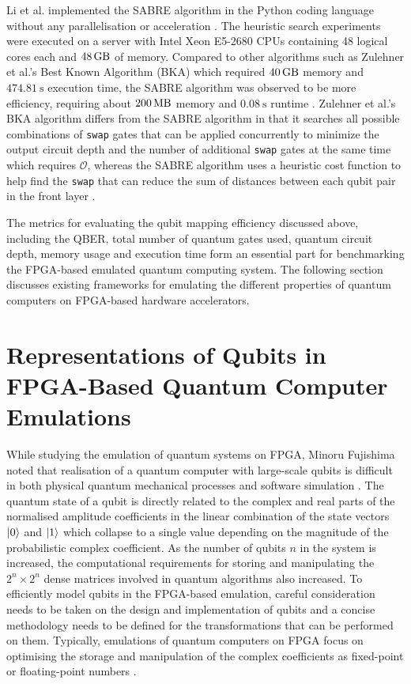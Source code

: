 Li et al. implemented the SABRE algorithm in the Python coding language without any parallelisation or acceleration \cite{li2019tackling}. The heuristic search experiments were executed on a server with Intel Xeon E5-2680 CPUs containing 48 logical cores each and $\SI{48}{\giga\byte}$ of memory. Compared to other algorithms such as Zulehner et al.'s Best Known Algorithm (BKA) which required $\SI{40}{\giga\byte}$ memory and $\SI{474.81}{\second}$ execution time, the SABRE algorithm was observed to be more efficiency, requiring about $\SI{200}{\mega\byte}$ memory and $\SI{0.08}{\second}$ runtime \cite{li2019tackling, zulehner2018efficient}. Zulehner et al.'s BKA algorithm differs from the SABRE algorithm in that it searches all possible combinations of \texttt{swap} gates that can be applied concurrently to minimize the output circuit depth and the number of additional \texttt{swap} gates at the same time which requires $\mathcal{O}$, whereas the SABRE algorithm uses a heuristic cost function to help find the \texttt{swap} that can reduce the sum of distances between each qubit pair in the front layer \cite{zulehner2018efficient, li2019tackling}.  

The metrics for evaluating the qubit mapping efficiency discussed above, including the QBER, total number of quantum gates used, quantum circuit depth, memory usage and execution time form an essential part for benchmarking the FPGA-based emulated quantum computing system. The following section discusses existing frameworks for emulating the different properties of quantum computers on FPGA-based hardware accelerators.

\section{Representations of Qubits in FPGA-Based Quantum Computer Emulations \label{sec:lit-qubit-rep}}

While studying the emulation of quantum systems on FPGA, Minoru Fujishima noted that realisation of a quantum computer with large-scale qubits is difficult in both physical quantum mechanical processes and software simulation \cite{fujishima2003fpga}. The quantum state of a qubit is directly related to the complex and real parts of the normalised amplitude coefficients in the linear combination of the state vectors $\ket{0}$ and $\ket{1}$ which collapse to a single value depending on the magnitude of the probabilistic complex coefficient. As the number of qubits $n$ in the system is increased, the computational requirements for storing and manipulating the $2^n \times 2^n$ dense matrices involved in quantum algorithms also increased. To efficiently model qubits in the FPGA-based emulation, careful consideration needs to be taken on the design and implementation of qubits and a concise methodology needs to be defined for the transformations that can be performed on them. Typically, emulations of quantum computers on FPGA focus on optimising the storage and manipulation of the complex coefficients as fixed-point or floating-point numbers \cite{Aminian2008, Hlukhov2021, Khalid2004, Khalil2015}.  

